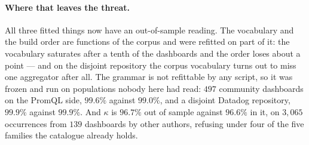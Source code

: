 \paragraph{Where that leaves the threat.}
All three fitted things now have an out-of-sample reading. The vocabulary and the build
order are functions of the corpus and were refitted on part of it: the vocabulary
saturates after a tenth of the dashboards and the order loses about a point --- and on
the disjoint repository the corpus vocabulary turns out to miss one aggregator after
all. The
grammar is not refittable by any script, so it was frozen and run on populations nobody
here had read: $497$ community dashboards on the PromQL side, $99.6\%$ against $99.0\%$,
and a disjoint Datadog repository, $99.9\%$ against $99.9\%$. And $\kappa$ is $96.7\%$
out of sample against $96.6\%$ in it, on $3{,}065$ occurrences from $139$ dashboards by
other authors, refusing under four of the five families the catalogue already holds.

